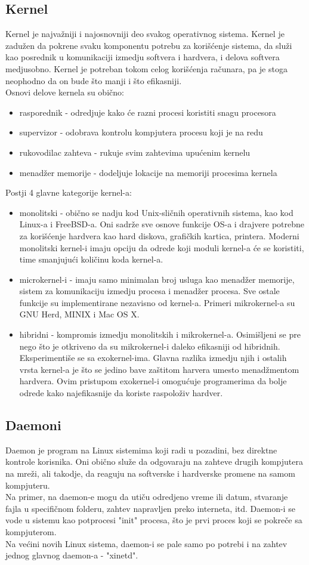 \subsection{Kernel}
Kernel je najvažniji i najosnovniji deo svakog operativnog sistema. Kernel je zadužen da pokrene svaku komponentu potrebu za korišćenje sistema, da služi kao posrednik u komunikaciji izmedju softvera i hardvera, i delova softvera medjusobno. Kernel je potreban tokom celog korišćenja računara, pa je stoga neophodno da on bude što manji i što efikasniji.\\
Osnovi delove kernela su obično:
\begin{itemize}
\item rasporednik - odredjuje kako će razni procesi koristiti snagu procesora
\item supervizor - odobrava kontrolu kompjutera procesu koji je na redu
\item rukovodilac zahteva - rukuje svim zahtevima upućenim kernelu
\item menadžer memorije - dodeljuje lokacije na memoriji procesima kernela
\end{itemize}
Postji 4 glavne kategorije kernel-a:
\begin{itemize}
\item monolitski - obično se nadju kod Unix-sličnih operativnih sistema, kao kod Linux-a i FreeBSD-a. Oni sadrže sve osnove funkcije OS-a i drajvere potrebne za korišćenje hardvera kao hard diskova, grafičkih kartica, printera. Moderni monolitski kernel-i imaju opciju da odrede koji moduli kernel-a će se koristiti, time smanjujući količinu koda kernel-a.
\item microkernel-i - imaju samo minimalan broj usluga kao menadžer memorije, sistem za komunikaciju izmedju procesa i menadžer procesa. Sve ostale funkcije su implementirane nezavisno od kernel-a. Primeri mikrokernel-a su GNU Herd, MINIX i Mac OS X.
\item hibridni - kompromis izmedju monolitskih i mikrokernel-a. Osimišljeni se pre nego što je otkriveno da su mikrokernel-i daleko efikasniji od hibridnih.
Eksperimentiše se sa exokernel-ima. Glavna razlika izmedju njih i ostalih vrsta kernel-a je što se jedino bave zaštitom harvera umesto menadžmentom hardvera. Ovim pristupom exokernel-i omogućuje programerima da bolje odrede kako najefikasnije da koriste raspoloživ hardver.
\end{itemize}
\newpage
\subsection{Daemoni}
Daemon je program na Linux sistemima koji radi u pozadini, bez direktne kontrole korisnika. Oni obično služe da odgovaraju na zahteve drugih kompjutera na mreži, ali takodje, da reaguju na softverske i hardverske promene na samom kompjuteru.\\
Na primer, na daemon-e mogu da utiču odredjeno vreme ili datum, stvaranje fajla u specifičnom folderu, zahtev napravljen preko interneta, itd.
Daemon-i se vode u sistemu kao potprocesi "init" procesa, što je prvi proces koji se pokreče sa kompjuterom.\\
Na većini novih Linux sistema, daemon-i se pale samo po potrebi i na zahtev jednog glavnog daemon-a - "xinetd".

